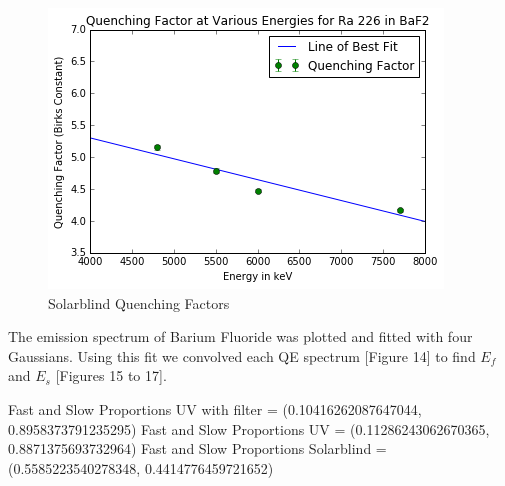 \documentclass{article}
\begin{document}
\begin{figure}[H]
  \centering
  \begin{minipage}[b]{0.4\textwidth}
    \includegraphics[width=\textwidth]{qfsb.png}
    \caption{Solarblind Quenching Factors}
  \end{minipage}
\end{figure}


The emission spectrum of Barium Fluoride was plotted and fitted with four Gaussians. Using this fit we convolved each QE spectrum [Figure 14] to find $E_f$ and $E_s$ [Figures 15 to 17].

\setlength{\parskip}{2em}
\noindent
Fast and Slow Proportions UV with filter = (0.10416262087647044, 0.8958373791235295)
\noindent
Fast and Slow Proportions UV = (0.11286243062670365, 0.8871375693732964)
\noindent
Fast and Slow Proportions Solarblind = (0.5585223540278348, 0.4414776459721652)
\end{document}

